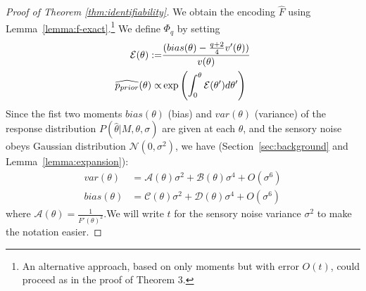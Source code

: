 \begin{proof}[Proof of Theorem \ref{thm:identifiability}]
We obtain the encoding $\widehat{F}$ using Lemma~\ref{lemma:f-exact}.\footnote{An alternative approach, based on only moments but with error $O(t)$, could proceed as in the proof of Theorem 3.}
We define $\Phi_q$ by setting
\begin{align*}
    \mathcal{E}(\theta) := & \frac{(bias(\theta) - \frac{q+2}{4} v'(\theta))}{v(\theta)} \\
    \widehat{p_{prior}}(\theta) \propto & \exp\left( \int_0^\theta \mathcal{E}(\theta') d\theta' \right)
\end{align*}
Since the fist two moments $bias(\theta)$ (bias) and $var(\theta)$ (variance) of the response distribution $P(\widehat{\theta}|M,\theta, \sigma)$ are given at each $\theta$, and the sensory noise obeys Gaussian distribution $\mathcal{N}(0, \sigma^2)$, we have (Section~\ref{sec:background} and Lemma~\ref{lemma:expansion}):
\begin{align*}
    var(\theta) &= \mathcal{A}(\theta)\sigma^2 + \mathcal{B}(\theta)\sigma^4 + O(\sigma^6)\\
    bias(\theta) &= \mathcal{C}(\theta)\sigma^2 + \mathcal{D}(\theta)\sigma^4 + O(\sigma^6)
\end{align*}
where $\mathcal{A}(\theta) = \frac{1}{F'(\theta)^2}.$We will write $t$ for the sensory noise variance $\sigma^2$ to make the notation easier.



\end{proof}
